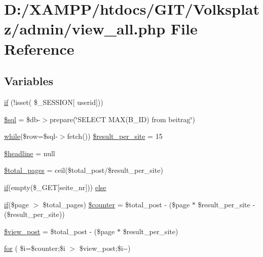 \hypertarget{view__all_8php}{}\section{D\+:/\+X\+A\+M\+P\+P/htdocs/\+G\+I\+T/\+Volksplatz/admin/view\+\_\+all.php File Reference}
\label{view__all_8php}
\subsection*{Variables}
\begin{DoxyCompactItemize}
\item 
\mbox{\hyperlink{view__all_8php_ac0971e25a4f61580752c758ef520f6b2}{if}} (!isset( \$\+\_\+\+S\+E\+S\+S\+I\+ON\mbox{[} \textquotesingle{}userid\textquotesingle{}\mbox{]}))
\item 
\mbox{\hyperlink{view__all_8php_a047170d6020a882807665812a27e2525}{\$sql}} = \$db-\/$>$prepare(\char`\"{}S\+E\+L\+E\+CT M\+AX(B\+\_\+\+ID) from beitrag\char`\"{})
\item 
\mbox{\hyperlink{showpost_8php_a0074fdcf62116989383290ee4de5f453}{while}}(\$row=\$sql-\/$>$fetch()) \mbox{\hyperlink{view__all_8php_a7ef85f3a1ee9aa9e2840b2d071fd15b5}{\$result\+\_\+per\+\_\+site}} = 15
\item 
\mbox{\hyperlink{view__all_8php_a719624ae2e05a123335f853fbbeefe29}{\$headline}} = null
\item 
\mbox{\hyperlink{view__all_8php_a75dd972125f47d333492e70523d1aa6a}{\$total\+\_\+pages}} = ceil(\$total\+\_\+post/\$result\+\_\+per\+\_\+site)
\item 
\mbox{\hyperlink{view__all_8php_ac0971e25a4f61580752c758ef520f6b2}{if}}(empty(\$\+\_\+\+G\+ET\mbox{[}\textquotesingle{}seite\+\_\+nr\textquotesingle{}\mbox{]})) \mbox{\hyperlink{view__all_8php_a15763ab84c36ab79512146d33738c5f5}{else}}
\item 
\mbox{\hyperlink{view__all_8php_ac0971e25a4f61580752c758ef520f6b2}{if}}(\$page $>$ \$total\+\_\+pages) \mbox{\hyperlink{view__all_8php_a70b0ab3614a32a28772b6ca4a906a58b}{\$counter}} = \$total\+\_\+post -\/ (\$page $\ast$ \$result\+\_\+per\+\_\+site -\/ (\$result\+\_\+per\+\_\+site))
\item 
\mbox{\hyperlink{view__all_8php_a5b99fdb1a492e115a7192ca90bc4c455}{\$view\+\_\+post}} = \$total\+\_\+post -\/ (\$page $\ast$ \$result\+\_\+per\+\_\+site)
\item 
\mbox{\hyperlink{view__all_8php_a80c68fef22aea95c13a63061dcbb9e25}{for}} ( \$i=\$counter;\$i $>$ \$view\+\_\+post;\$i-\/-\/)
\end{DoxyCompactItemize}


